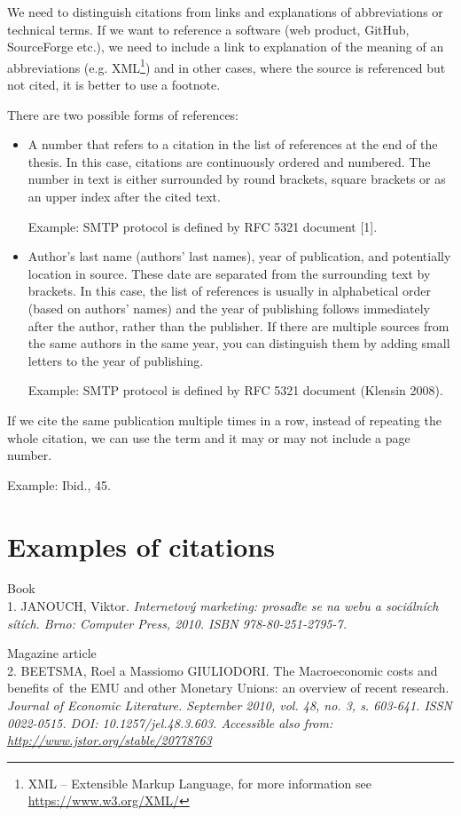 {{We need to distinguish citations from links and explanations of abbreviations or technical terms. If we want to reference a software (web product, GitHub, SourceForge etc.), we need to include a link to explanation of the meaning of an abbreviations (e.g. XML\footnote{XML -- Extensible Markup Language, for more information see \url{https://www.w3.org/XML/}}) and in other cases, where the source is referenced but not cited, it is better to use a footnote.

There are two possible forms of references:
\begin{itemize}
  \item{A number that refers to a citation in the list of references at the end of the thesis. In this case, citations are continuously ordered and numbered. The number in text is either surrounded by round brackets, square brackets or as an upper index after the cited text.

  Example: SMTP protocol is defined by RFC 5321 document [1].}
  \item{Author's last name (authors' last names), year of publication, and potentially location in source. These date are separated from the surrounding text by brackets. In this case, the list of references is usually in alphabetical order (based on authors' names) and the year of publishing follows immediately after the author, rather than the publisher. If there are multiple sources from the same authors in the same year, you can distinguish them by adding small letters to the year of publishing.

  Example: SMTP protocol is defined by RFC 5321 document (Klensin 2008).}
\end{itemize}

If we cite the same publication multiple times in a row, instead of repeating the whole citation, we can use the term  and it may or may not include a page number.

  Example: Ibid., 45.

\section{Examples of citations}

Book \\
1. JANOUCH, Viktor. \it Internetový marketing: prosaďte se na webu a sociálních sítích\rm . Brno: Computer Press, 2010. ISBN 978-80-251-2795-7.

\bigskip
\noindent Magazine article \\
2. BEETSMA, Roel a Massiomo GIULIODORI. The Macroeconomic costs and benefits of~the EMU and other Monetary Unions: an overview of recent research. \it Journal of Economic Literature\rm . September 2010, vol. 48, no. 3, s. 603-641. ISSN 0022-0515. \linebreak[4] DOI: 10.1257/jel.48.3.603. Accessible also from: \url{http://www.jstor.org/stable/20778763}

}}

